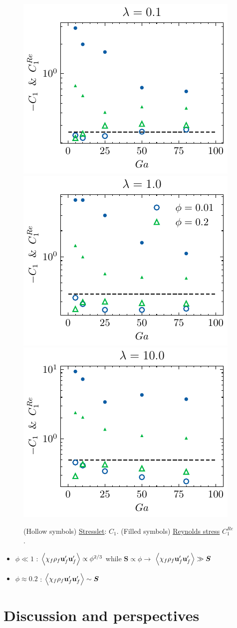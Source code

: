 \documentclass{sintefbeamer}
\begin{document}
\begin{frame}
  \begin{figure}[h!]
    \centering
    \includegraphics[height = 0.25\textwidth]{image/HOMOGENEOUS_final/PA/Sdev_diapo_l_1.pdf}
    \includegraphics[height = 0.25\textwidth]{image/HOMOGENEOUS_final/PA/Sdev_diapo_l_10.pdf}
    \includegraphics[height = 0.25\textwidth]{image/HOMOGENEOUS_final/PA/Sdev_diapo_l_100.pdf}
    \caption{
      (Hollow symbols) \underline{Stresslet}: $C_1$. 
      (Filled symbols) \underline{Reynolds stress} $C_1^{Re}$. 
     }
\end{figure}
\begin{itemize}
\item $\phi \ll 1$ : $\left<\chi_f\rho_f\textbf{u}_f'\textbf{u}_f'\right>\propto \phi^{2/3}$ while $\bm S \propto \phi \rightarrow$   $\left<\chi_f\rho_f\textbf{u}_f'\textbf{u}_f'\right>\gg \bm S$
\item $\phi \approx 0.2$ : $\left<\chi_f\rho_f\textbf{u}_f'\textbf{u}_f'\right>\sim \bm S$
\end{itemize}
\end{frame}

\section{Discussion and perspectives}
\end{document}
